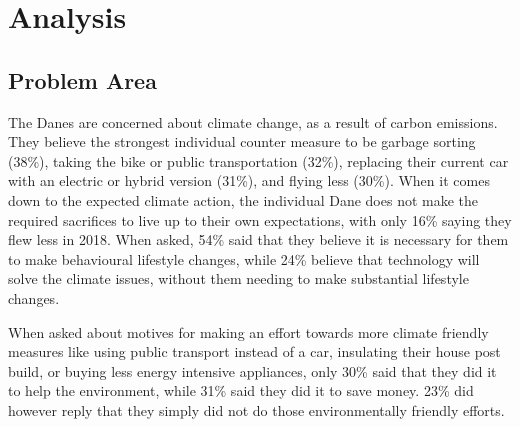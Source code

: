 \chapter{Analysis}\label{chap:analysis}
\begin{comment}
    Climate change is a problem that can be traced all the way back to the origin of humans[cite]. Today, the list of problems climate change becomes longer, and longer. For an example, the increasing temperature can affect the oceans, and cause droughts, but also the clearing of the rain forests, reduces the amount of carbon dioxide gasses the earth naturally reduces[cite]. Even knowing all the consequences, humans still continue to actively contribute negatively to the climate changing. There are many already existing ways that people are improving and reducing the climate change, however, multiple studies suggests that the average person might be unaware or does not care about the climate changing for different reasons[cite]. While the average person is not the main reason for the climate changing, they can still play an important role to help contribute by creating awareness and deal properly with the consequences. However, the average person is not necessarily completely clear on what climate change includes and what the consequences are and what they can do to help. 
\end{comment}
\section{Problem Area}
    The Danes are concerned about climate change, as a result of carbon emissions. They believe the strongest individual counter measure to be garbage sorting (38\%), taking the bike or public transportation (32\%), replacing their current car with an electric or hybrid version (31\%), and flying less (30\%)\cite{concito}. When it comes down to the expected climate action, the individual Dane does not make the required sacrifices to live up to their own expectations, with only 16\% saying they flew less in 2018\cite{concito}. When asked, 54\% said that they believe it is necessary for them to make behavioural lifestyle changes, while 24\% believe that technology will solve the climate issues, without them needing to make substantial lifestyle changes\cite{concito}.
    
    When asked about motives for making an effort towards more climate friendly measures like using public transport instead of a car, insulating their house post build, or buying less energy intensive appliances, only 30\% said that they did it to help the environment, while 31\% said they did it to save money. 23\% did however reply that they simply did not do those environmentally friendly efforts\cite{concito}.
    
